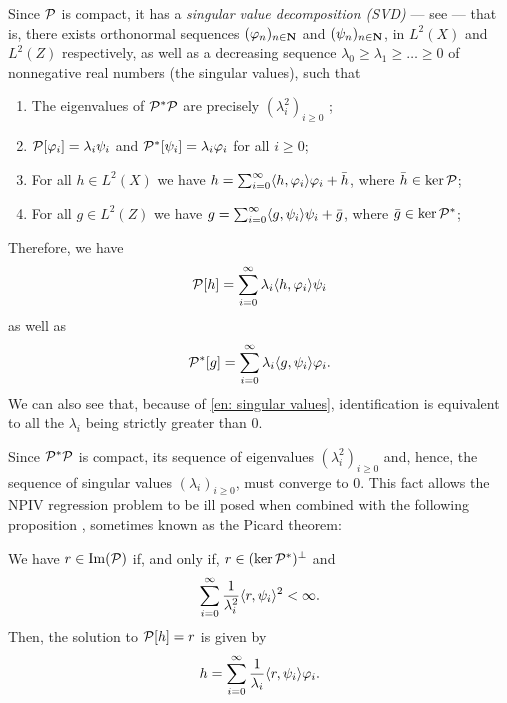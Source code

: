 Since $ \mathcal{P} $ is compact, it has a \emph{singular value decomposition (SVD)} --- see \cite[section 15.4]{kress89} --- that is, there exists orthonormal sequences $ ( \varphi_{ n } )_{ n\in\mathbf{N} } $ and $ ( \psi_{ n } )_{ n\in\mathbf{N} } $, in $ L^2 ( X ) $ and $ L^2 ( Z ) $ respectively, as well as a decreasing sequence $ \lambda_{ 0 } \geq \lambda_{ 1 } \geq \dots \geq 0 $ of nonnegative real numbers (the singular values), such that
\begin{enumerate}[label=(\alph*)]
    \item The eigenvalues of $ \mathcal{P}^{ * } \mathcal{P} $ are precisely $ ( \lambda_{ i }^2 )_{ i \geq 0 } $ \label{en: singular values};
    \item $ \mathcal{P} [ \varphi_{ i } ] = \lambda_{ i } \psi_{ i } $ and $ \mathcal{P}^{ * } [ \psi_{ i } ] = \lambda_{ i } \varphi_{ i } $ for all $ i \geq 0 $;
    \item For all $ h \in L^2 ( X ) $ we have $ h = \sum_{ i=0 }^{ \infty } \langle  h, \varphi_{ i }  \rangle \varphi_{ i } + \bar{ h } $, where $ \bar{ h } \in \ker \mathcal{P} $;
    \item For all $ g \in L^2 ( Z ) $ we have $ g = \sum_{ i=0 }^{ \infty } \langle  g, \psi_{ i }  \rangle \psi_{ i } + \bar{ g } $, where $ \bar{ g } \in \ker \mathcal{P}^{ * } $;
\end{enumerate}
Therefore, we have
\begin{equation*}
    \mathcal{P} [ h ] = \sum_{ i=0 }^{ \infty } \lambda_{ i } \langle  h, \varphi_{ i }  \rangle \psi_{ i }
\end{equation*}
as well as
\begin{equation*}
    \mathcal{P}^{ * } [ g ] = \sum_{ i=0 }^{ \infty } \lambda_{ i } \langle  g, \psi_{ i }  \rangle \varphi_{ i }
.\end{equation*}
We can also see that, because of \ref{en: singular values}, identification is equivalent to all the $ \lambda_{ i } $ being strictly greater than $ 0 $.

Since $ \mathcal{P}^{ * } \mathcal{P} $ is compact, its sequence of eigenvalues $ ( \lambda_{ i }^2 )_{ i \geq 0 } $ and, hence, the sequence of singular values $ ( \lambda_{ i } )_{ i \geq 0 } $, must converge to $ 0 $.
This fact allows the NPIV regression problem to be ill posed when combined with the following proposition \cite[theorem 15.18]{kress89}, sometimes known as the Picard theorem:
\begin{prop}
    \label{prop: picard}
    We have $ r \in \operatorname{Im} ( \mathcal{P} ) $ if, and only if, $ r \in ( \ker \mathcal{P}^{ * } )^{ \perp } $ and
    \begin{equation*}
        \sum_{ i=0 }^{ \infty } \frac{ 1 }{ \lambda_{ i }^2 } \langle  r, \psi_{ i }  \rangle^2 < \infty
    .\end{equation*}
    Then, the solution to $ \mathcal{P} [ h ] = r $ is given by
    \begin{equation}
        \label{eq: closed form solution}
        h = \sum_{ i=0 }^{ \infty } \frac{ 1 }{ \lambda_{ i } } \langle  r, \psi_{ i }  \rangle \varphi_{ i }
    .\end{equation}
\end{prop}

